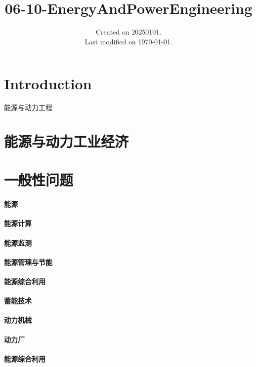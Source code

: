 \documentclass[UTF8]{../../ApplicationUniverse}
\begin{document}
\title{06-10-EnergyAndPowerEngineering}
\date{Created on 20250101.\\   Last modified on \today.}
\maketitle
\tableofcontents


\chapter{Introduction}

能源与动力工程

\chapter{能源与动力工业经济}
\chapter{一般性问题}
    \subsubsection{能源}
        \subsubsection{能源计算}
        \subsubsection{能源监测}
        \subsubsection{能源管理与节能}
        \subsubsection{能源综合利用}
    \subsubsection{蓄能技术}
    \subsubsection{动力机械}
    \subsubsection{动力厂}
    \subsubsection{能源综合利用}
\end{document}
